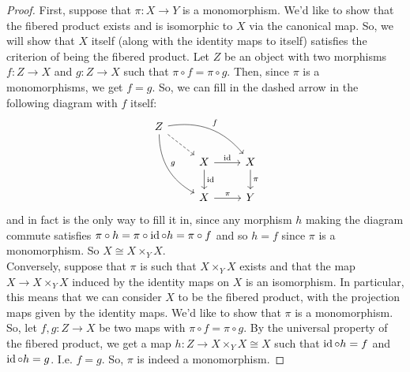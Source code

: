 \documentclass[12pt]{exam}
\begin{document}
\begin{proof}
	First, suppose that $\pi : X \to Y$ is a monomorphism. We'd like to show that the fibered product exists and is isomorphic to $X$ via the canonical map. So, we will show that $X$ itself (along with the identity maps to itself) satisfies the criterion of being the fibered product. Let $Z$ be an object with two morphisms $f : Z \to X$ and $g : Z \to X$ such that $\pi \circ f = \pi \circ g$. Then, since $\pi$ is a monomorphisms, we get $f = g$. So, we can fill in the dashed arrow in the following diagram with $f$ itself:
	\[ \begin{tikzcd} Z \arrow[bend left]{drr}{f} \arrow[bend right]{ddr}{g} \arrow[dashed]{dr} \\ & X \arrow{r}{\id} \arrow{d}{\id} & X \arrow{d}{\pi} \\ & X \arrow{r}{\pi} & Y \end{tikzcd} \]
	and in fact is the only way to fill it in, since any morphism $h$ making the diagram commute satisfies $\pi \circ h = \pi \circ \operatorname{id} \circ h = \pi \circ f$ and so $h = f$ since $\pi$ is a monomorphism. So $X \cong X \times_Y X$. \\
	
	Conversely, suppose that $\pi$ is such that $X \times_Y X$ exists and that the map $X \to X \times_Y X$ induced by the identity maps on $X$ is an isomorphism. In particular, this means that we can consider $X$ to be the fibered product, with the projection maps given by the identity maps. We'd like to show that $\pi$ is a monomorphism. So, let $f,g : Z \to X$ be two maps with $\pi \circ f = \pi \circ g$. By the universal property of the fibered product, we get a map $h : Z \to X \times_Y X \cong X$ such that $\operatorname{id} \circ h = f$ and $\operatorname{id} \circ h = g$. I.e. $f = g$. So, $\pi$ is indeed a monomorphism.
\end{proof}
\end{document}
